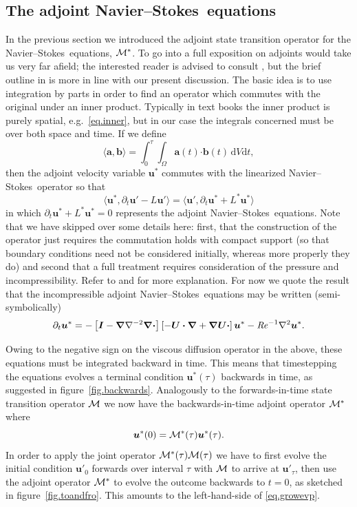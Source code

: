 \documentclass[11pt,a4paper]{report}
\newcommand\Rey{\mbox{\textit{Re}}}
\newcommand\cd{\mathrm{d}}
\newcommand\NavSto{Navier--Stokes}
\newcommand\LNS{linearized \NavSto}
\newcommand{\eg}{e.g.\ }
\newcommand\Ubase{{\bm{U}}}
\newcommand\upert{{\bm{u}'}}
\newcommand\uadj{\bm{u}^*}
\newcommand\Mop{{\cal M}}
\newcommand\Madj{{\cal M^*}}
\begin{document}
\subsection{The adjoint \NavSto\ equations}
\label{sec.adjoint}

In the previous section we introduced the adjoint state transition
operator for the \NavSto\ equations, $\Madj$.  To go into a full
exposition on adjoints would take us very far afield; the interested
reader is advised to consult \citet{lubo14}, but the brief outline in
\citet{bbs08b} is more in line with our present discussion.  The basic
idea is to use integration by parts in order to find an operator which
commutes with the original under an inner product.  Typically in text
books the inner product is purely spatial, \eg \eqref{eq.inner}, but
in our case the integrals concerned must be over both space and time.
If we define
\begin{equation}
\langle\bm{a},\bm{b}\rangle=\int_0^\tau\int_\Omega \bm{a}(t)\bm{\cdot
  b}(t)\,\cd V\cd t,
\label{eq.inner2}
\end{equation}
then the adjoint velocity variable $\uadj$ commutes with the
\LNS\ operator so that
\begin{equation}
\langle\uadj,\partial_t\upert-L\upert\rangle =
\langle\upert,\partial_t\uadj+L^*\uadj\rangle
\label{eq.commute2}
\end{equation}
in which $\partial_t\uadj+L^*\uadj=0$ represents the adjoint
\NavSto\ equations.  Note that we have skipped over some details here:
first, that the construction of the operator just requires the
commutation holds with compact support (so that boundary conditions
need not be considered initially, whereas more properly they do) and
second that a full treatment requires consideration of the pressure
and incompressibility.  Refer to \citet{bbs08b} and \citet{mbs13} for
more explanation.  For now we quote the result that the incompressible
adjoint \NavSto\ equations may be written (semi-symbolically)
\begin{equation}
\partial_t\uadj =
-\left[\bm{I}-\bm{\nabla}\nabla^{-2}\bm{\nabla\cdot}\right]
\left[-\Ubase\bm{\cdot\nabla}
  +\bm{\nabla\Ubase}\bm{\cdot}\right]\uadj
- \Rey^{-1}\nabla^2\uadj.
\end{equation}

Owing to the negative sign on the viscous diffusion operator in the
above, these equations must be integrated backward in time.  This
means that timestepping the equations evolves a terminal condition
$\uadj(\tau)$ backwards in time, as suggested in
figure~\ref{fig.backwards}.  Analogously to the forwards-in-time state
transition operator $\Mop$ we now have the backwards-in-time adjoint
operator $\Madj$ where
\begin{equation}
\uadj(0) = \Madj(\tau)\uadj(\tau).
\end{equation}
In order to apply the joint operator $\Madj(\tau)\Mop(\tau)$ we have
to first evolve the initial condition $\upert_0$ forwards over
interval $\tau$ with $\Mop$ to arrive at $\upert_\tau$, then use the
adjoint operator $\Madj$ to evolve the outcome backwards to $t=0$, as
sketched in figure~\ref{fig.toandfro}.  This amounts to the
left-hand-side of \eqref{eq.growevp}.
\end{document}
